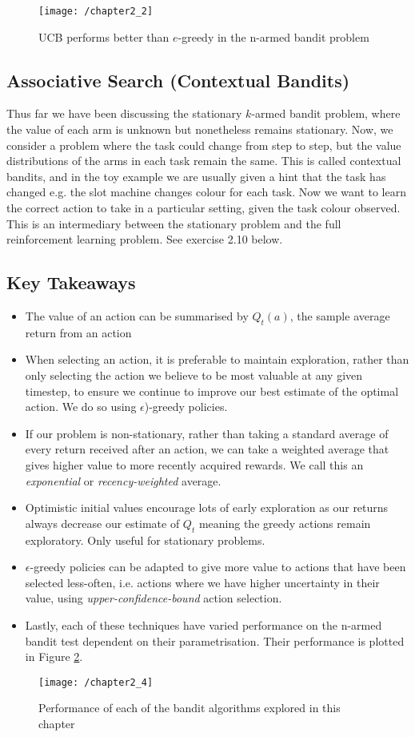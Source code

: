 \begin{figure}
	\centering
	\texttt{[image: /chapter2\_2]}
	\caption{UCB performs better than \(e\)-greedy in the n-armed bandit problem}
	\label{fig:chapter2_2}
\end{figure}

\subsection{Associative Search (Contextual Bandits)}
Thus far we have been discussing the stationary $k$-armed bandit problem, where the value of each arm is unknown but nonetheless remains stationary. Now, we consider a problem where the task could change from step to step, but the value distributions of the arms in each task remain the same. This is called contextual bandits, and in the toy example we are usually given a hint that the task has changed e.g. the slot machine changes colour for each task. Now we want to learn the correct action to take in a particular setting, given the task colour observed. This is an intermediary between the stationary problem and the full reinforcement learning problem. See exercise 2.10 below.

\subsection{Key Takeaways}
\begin{itemize}
\item The value of an action can be summarised by \(Q_t(a)\), the sample average return from an action
\item When selecting an action, it is preferable to maintain exploration, rather than only selecting the action we believe to be most valuable at any given timestep, to ensure we continue to improve our best estimate of the optimal action. We do so using \(\epsilon\))-greedy policies.
\item If our problem is non-stationary, rather than taking a standard average of every return received after an action, we can take a weighted average that gives higher value to more recently acquired rewards. We call this an \textit{exponential} or \textit{recency-weighted} average.
\item Optimistic initial values encourage lots of early exploration as our returns always decrease our estimate of \(Q_t\) meaning the greedy actions remain exploratory. Only useful for stationary problems.
\item \(\epsilon\)-greedy policies can be adapted to give more value to actions that have been selected less-often, i.e. actions where we have higher uncertainty in their value, using \textit{upper-confidence-bound} action selection.
\item Lastly, each of these techniques have varied performance on the n-armed bandit test dependent on their parametrisation. Their performance is plotted in Figure \ref{fig:chapter2_4}.
\end{itemize}

\begin{figure}
	\centering
	\texttt{[image: /chapter2\_4]}
	\caption{Performance of each of the bandit algorithms explored in this chapter}
	\label{fig:chapter2_4}
\end{figure}

